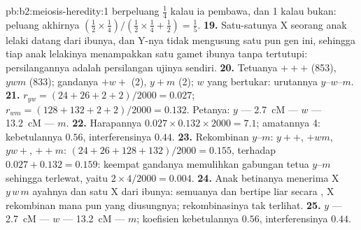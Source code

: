 \begin{solution}{pb:b2:meiosis-heredity:1}
berpeluang $\tfrac14$ kalau ia pembawa, dan 1 kalau bukan: peluang
akhirnya $(\tfrac12\times
\tfrac14)/(\tfrac12\times\tfrac14 + \tfrac12) = \tfrac15$.
\textbf{19.} Satu-satunya X seorang anak lelaki datang dari ibunya, dan
Y-nya tidak mengusung satu pun gen ini, sehingga tiap anak lelakinya
menampakkan satu gamet ibunya tanpa tertutupi: persilangannya adalah
persilangan ujinya sendiri.
\textbf{20.} Tetuanya $+++$ (853), $ywm$ (833);  gandanya
$+w+$ (2), $y+m$ (2); $w$ yang bertukar: urutannya $y$--$w$--$m$.
\textbf{21.} $r_{yw} = (24 + 26 + 2 + 2)/2000 = 0.027$; $r_{wm} = (128
+ 132 + 2 + 2)/2000 = 0.132$. Petanya: $y$ --- \qty{2.7}{cM} --- $w$ ---
\qty{13.2}{cM} --- $m$.
\textbf{22.} Harapannya $0.027\times 0.132\times 2000 = 7.1$; amatannya
4: kebetulannya $0.56$, interferensinya $0.44$.
\textbf{23.} Rekombinan $y$--$m$: $y++$, $+wm$, $yw+$, $++m$: $(24 +
26 + 128 + 132)/2000 = 0.155$, terhadap $0.027 + 0.132 = 0.159$: keempat
 gandanya memulihkan gabungan tetua $y$--$m$ sehingga
terlewat, yaitu $2\times 4/2000 = 0.004$.
\textbf{24.} Anak betinanya menerima X $y\,w\,m$ ayahnya dan satu X
dari ibunya: semuanya  dan bertipe liar secara ,
X rekombinan mana pun yang diusungnya; rekombinasinya tak terlihat.
\textbf{25.} $y$ --- \qty{2.7}{cM} --- $w$ --- \qty{13.2}{cM} --- $m$;
koefisien kebetulannya $0.56$, interferensinya $0.44$.
\end{solution}
